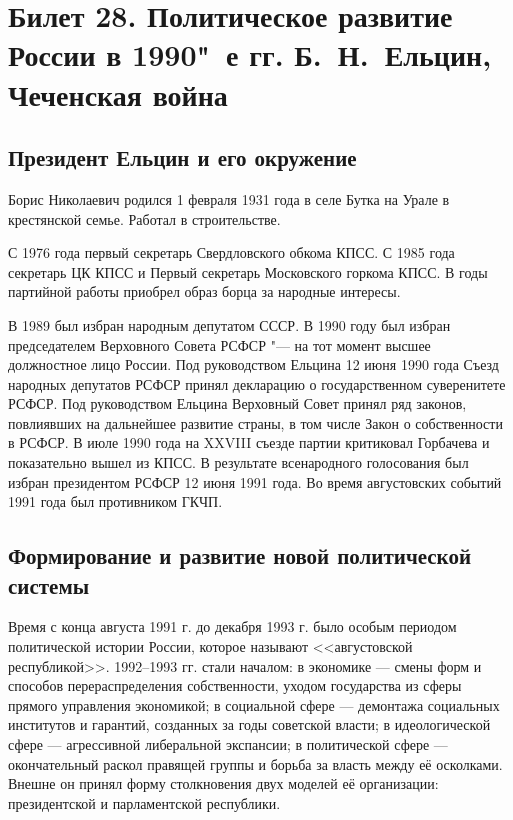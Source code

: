 \section{Билет 28. Политическое развитие России в 1990"~е гг. Б.~Н.~Ельцин, Чеченская война}

\subsection{Президент Ельцин и его окружение}

Борис Николаевич родился 1 февраля 1931 года в селе Бутка на Урале в крестянской семье. Работал в строительстве. 

С 1976 года первый секретарь Свердловского обкома КПСС. С 1985 года секретарь ЦК КПСС и Первый секретарь Московского горкома КПСС. В годы партийной работы приобрел образ борца за народные интересы. 

В 1989 был избран народным депутатом СССР. В 1990 году был избран председателем Верховного Совета РСФСР "--- на тот момент высшее должностное лицо России. Под руководством Ельцина 12 июня 1990 года Съезд народных депутатов РСФСР принял декларацию о государственном суверенитете РСФСР. Под руководством Ельцина Верховный Совет принял ряд законов, повлиявших на дальнейшее развитие страны, в том числе Закон о собственности в РСФСР. В июле 1990 года на XXVIII съезде партии критиковал Горбачева и показательно вышел из КПСС. В результате всенародного голосования был избран президентом РСФСР 12 июня 1991 года. Во время августовских событий 1991 года был противником ГКЧП. 

\subsection{Формирование и развитие новой политической системы}

Время с конца августа 1991 г. до декабря 1993 г. было особым периодом политической истории России, которое называют <<августовской республикой>>. 1992--1993 гг. стали началом: в экономике --- смены форм и способов перераспределения собственности, уходом государства из сферы прямого управления экономикой; в социальной сфере --- демонтажа социальных институтов и гарантий, созданных за годы советской власти; в идеологической сфере --- агрессивной либеральной экспансии; в политической сфере --- окончательный раскол правящей группы и борьба за власть между её осколками. Внешне он принял форму столкновения двух моделей её организации: президентской и парламентской республики.

